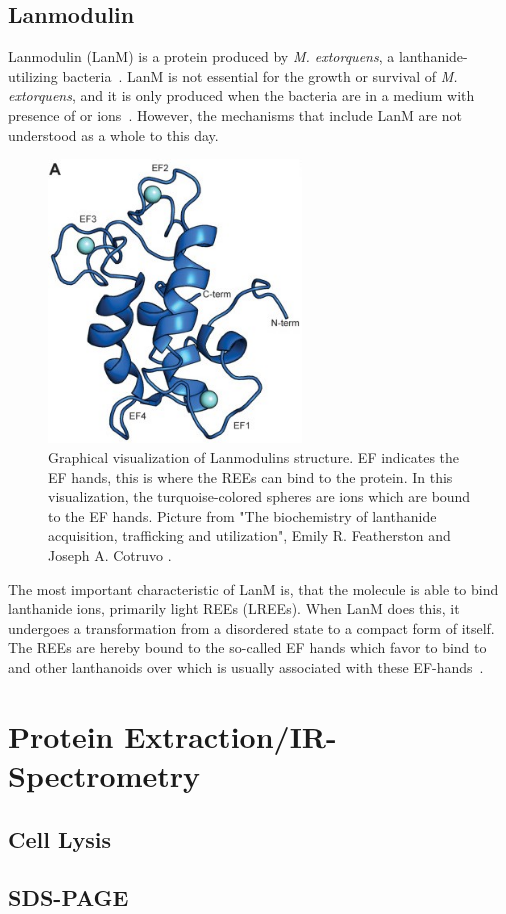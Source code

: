 \subsection{Lanmodulin\authorA}

Lanmodulin (LanM) is a protein produced by \textit{M. extorquens}, a lanthanide-utilizing bacteria~\cite{lanmdiscovery}.
LanM is not essential for the growth or survival of \textit{M. extorquens}, and it is only produced when the bacteria are in a medium with presence of  or  ions~\cite{lanmroleinbiology}.
However, the mechanisms that include LanM are not understood as a whole to this day.

\begin{figure}[H]
    \centering
    \includegraphics[width=0.6\textwidth]{./media/images/lanm_structure}
    \caption{Graphical visualization of Lanmodulins structure. EF indicates the EF hands, this is where the REEs can bind to the protein. In this visualization, the turquoise-colored spheres are  ions which are bound to the EF hands. Picture from "The biochemistry of lanthanide acquisition, trafficking and utilization", Emily R. Featherston and Joseph A. Cotruvo \cite{lanmroleinbiology}.}
    \label{fig:lanm_structure}
\end{figure}

The most important characteristic of LanM is, that the molecule is able to bind lanthanide ions, primarily light REEs (LREEs).
When LanM does this, it undergoes a transformation from a disordered state to a compact form of itself.
The REEs are hereby bound to the so-called EF hands which favor to bind to  and other lanthanoids over  which is usually associated with these EF-hands~\cite{lanmstructure}.


\section{Protein Extraction/IR-Spectrometry\authorB{}}


\subsection{Cell Lysis}

\subsection{SDS-PAGE}
